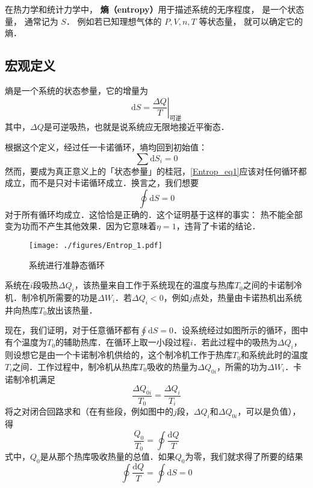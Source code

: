 
在热力学和统计力学中， \textbf{熵（entropy）}用于描述系统的无序程度， 是一个状态量， 通常记为 $S$． 例如若已知理想气体的 $P, V, n, T$ 等状态量， 就可以确定它的熵． %

\subsection{宏观定义}

熵是一个系统的状态参量，它的增量为
\begin{equation}
\mathrm{d} S = \left . \frac{\Delta Q}{T}\right |_{\text{可逆}}
\end{equation}
其中，$\Delta Q$是可逆吸热，也就是说系统应无限地接近平衡态．

根据这个定义，经过任一卡诺循环，墒均回到初始值：
\begin{equation} \label{Entrop_eq1}
\sum{\text{d}S_i=0}
\end{equation}
然而，要成为真正意义上的「状态参量」的桂冠，\autoref{Entrop_eq1}应该对任何循环都成立，而不是只对卡诺循环成立．换言之，我们想要
\begin{equation}
\oint \mathrm d S =0
\end{equation}
对于所有循环均成立．这恰恰是正确的．这个证明基于这样的事实： 热不能全部变为功而不产生其他效果．因为它意味着$\eta=1$，违背了卡诺的结论．

\begin{figure}[ht]
\centering
\texttt{[image: ./figures/Entrop\_1.pdf]}
\caption{系统进行准静态循环} \label{Entrop_fig1}
\end{figure}

系统在$i$段吸热$\Delta Q_i$，该热量来自工作于系统现在的温度与热库$T_0$之间的卡诺制冷机．制冷机所需要的功是$\Delta W_i$．若$\Delta Q_i<0$，例如$j$点处，热量由卡诺热机出系统井向热库$T_0$放出该热量．

现在，我们证明，对于任意循环都有$\oint \mathrm d S =0 $．设系统经过如图所示的循环，图中有个温度为$T_0$的辅助热库．在循环上取一小段过程$i$．若此过程中的吸热为$\Delta Q_i$，则设想它是由一个卡诺制冷机供给的，这个制冷机工作于热库$T_0$和系统此时的温度$T_i$之间．工作过程中，制冷机从热库$T_0$吸收的热量为$\Delta Q_{0i}$，所需的功为$\Delta W_i$．卡诺制冷机满足
\begin{equation}
\frac{\Delta Q_{0i}}{T_0}=\frac{\Delta Q_i}{T_i}
\end{equation}
将之对闭合回路求和（在有些段，例如图中的$j$段，$\Delta Q_i$和$\Delta Q_{0i}$，可以是负值），得
\begin{equation}
\frac{Q_0}{T_0}=\oint{\frac{\text{d}Q}{T}}
\end{equation}
式中，$Q_0$是从那个热库吸收热量的总值．如果$Q_0$为零，我们就求得了所要的结果
\begin{equation}
\oint{\frac{\text{d}Q}{T}=\oint{\text{d}S=0}}
\end{equation}

